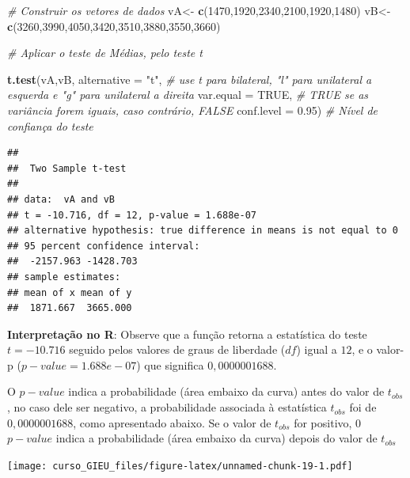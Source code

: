 \documentclass[
]{book}
\newenvironment{Shaded}{\begin{snugshade}}{\end{snugshade}}
\newcommand{\CommentTok}[1]{\textcolor[rgb]{0.56,0.35,0.01}{\textit{#1}}}
\newcommand{\DataTypeTok}[1]{\textcolor[rgb]{0.13,0.29,0.53}{#1}}
\newcommand{\DecValTok}[1]{\textcolor[rgb]{0.00,0.00,0.81}{#1}}
\newcommand{\FloatTok}[1]{\textcolor[rgb]{0.00,0.00,0.81}{#1}}
\newcommand{\KeywordTok}[1]{\textcolor[rgb]{0.13,0.29,0.53}{\textbf{#1}}}
\newcommand{\NormalTok}[1]{#1}
\newcommand{\OtherTok}[1]{\textcolor[rgb]{0.56,0.35,0.01}{#1}}
\newcommand{\StringTok}[1]{\textcolor[rgb]{0.31,0.60,0.02}{#1}}
\begin{document}
\begin{Shaded}
\begin{Highlighting}[]
\CommentTok{# Construir os vetores de dados}
\NormalTok{vA<-}\StringTok{ }\KeywordTok{c}\NormalTok{(}\DecValTok{1470}\NormalTok{,}\DecValTok{1920}\NormalTok{,}\DecValTok{2340}\NormalTok{,}\DecValTok{2100}\NormalTok{,}\DecValTok{1920}\NormalTok{,}\DecValTok{1480}\NormalTok{)}
\NormalTok{vB<-}\StringTok{ }\KeywordTok{c}\NormalTok{(}\DecValTok{3260}\NormalTok{,}\DecValTok{3990}\NormalTok{,}\DecValTok{4050}\NormalTok{,}\DecValTok{3420}\NormalTok{,}\DecValTok{3510}\NormalTok{,}\DecValTok{3880}\NormalTok{,}\DecValTok{3550}\NormalTok{,}\DecValTok{3660}\NormalTok{)}

\CommentTok{# Aplicar o teste de Médias, pelo teste t}

\KeywordTok{t.test}\NormalTok{(vA,vB,}
       \DataTypeTok{alternative =} \StringTok{"t"}\NormalTok{, }\CommentTok{# use t para bilateral, "l" para unilateral a esquerda e "g" para unilateral a direita}
       \DataTypeTok{var.equal =} \OtherTok{TRUE}\NormalTok{,  }\CommentTok{# TRUE se as variância forem iguais, caso contrário, FALSE}
       \DataTypeTok{conf.level =} \FloatTok{0.95}\NormalTok{) }\CommentTok{# Nível de confiança do teste}
\end{Highlighting}
\end{Shaded}

\begin{verbatim}
## 
## 	Two Sample t-test
## 
## data:  vA and vB
## t = -10.716, df = 12, p-value = 1.688e-07
## alternative hypothesis: true difference in means is not equal to 0
## 95 percent confidence interval:
##  -2157.963 -1428.703
## sample estimates:
## mean of x mean of y 
##  1871.667  3665.000
\end{verbatim}

\textbf{Interpretação no R}: Observe que a função retorna a estatística do teste \(t = -10.716\) seguido pelos valores de graus de liberdade (\(df\)) igual a \(12\), e o valor-p (\(p-value = 1.688e-07\)) que significa \(0,0000001688\).

O \(p-value\) indica a probabilidade (área embaixo da curva) antes do valor de \(t_{obs}\), no caso dele ser negativo, a probabilidade associada à estatística \(t_{obs}\) foi de \(0,0000001688\), como apresentado abaixo. Se o valor de \(t_{obs}\) for positivo, 0 \(p-value\) indica a probabilidade (área embaixo da curva) depois do valor de \(t_{obs}\)

\texttt{[image: curso\_GIEU\_files/figure-latex/unnamed-chunk-19-1.pdf]}
\end{document}
